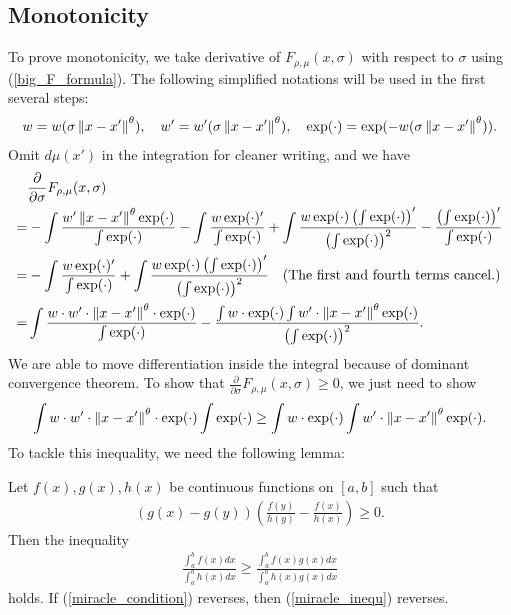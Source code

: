 \documentclass[10pt]{article}
\begin{document}
\subsection*{Monotonicity}
To prove monotonicity, we take derivative of $F_{\rho,\mu}(x,\sigma)$ with
respect to $\sigma$ using (\ref{big_F_formula}). The following simplified
notations will be used in the first several steps:
\begin{align}
    w = w(\sigma\left\lVert x-x'\right\rVert^{\theta}), \quad w'=w'(\sigma\left\lVert x-x'\right\rVert^{\theta}), \quad \exp(\cdot) = \exp(-w(\sigma\left\lVert x-x'\right\rVert^{\theta})).
\end{align}
Omit $d\mu(x')$ in the integration for cleaner writing, and we have
\begin{align}
      & \frac{\partial}{\partial \sigma} F_{\rho,\mu}(x,\sigma) \nonumber                                                                                                                                    \\
    = & -\int \frac{w'\left\lVert x-x'\right\rVert^{\theta}\exp(\cdot)}{\int \exp(\cdot)} -\int \frac{w\exp(\cdot)'}{\int \exp(\cdot)} +
    \int \frac{w \exp(\cdot) \left(\int \exp(\cdot)\right)'}{\left(\int \exp(\cdot)\right)^2} - \frac{\left(\int \exp(\cdot)\right)'}{\int \exp(\cdot)} \nonumber                                            \\
    = & -\int \frac{w\exp(\cdot)'}{\int \exp(\cdot)} +
    \int \frac{w \exp(\cdot) \left(\int \exp(\cdot)\right)'}{\left(\int \exp(\cdot)\right)^2} \quad \text{\normalfont (The first and fourth terms cancel.)} \nonumber                                        \\
    = & \int \frac{w\cdot w' \cdot \left\lVert x-x'\right\rVert^{\theta} \cdot \exp(\cdot)}{\int \exp(\cdot)}-\frac{\int w \cdot \exp(\cdot) \int w'\cdot \left\lVert x-x'\right\rVert^{\theta} \exp(\cdot)}{\left(\int \exp(\cdot)\right)^2}.
\end{align}
We are able to move differentiation inside the integral because of dominant convergence theorem. To show that $\frac{\partial}{\partial \sigma} F_{\rho,\mu}(x,\sigma) \geq 0$, we just need to show
\begin{align} \label{monotone_inequ}
    \int w\cdot w' \cdot \left\lVert x-x'\right\rVert^{\theta} \cdot \exp(\cdot) \int \exp(\cdot) \geq \int w \cdot \exp(\cdot) \int w'\cdot \left\lVert x-x'\right\rVert^{\theta} \exp(\cdot).
\end{align}
To tackle this inequality, we need the following lemma:
\begin{lemma}
    Let $f(x),g(x),h(x)$ be continuous functions on $[a,b]$ such that
    \begin{align} \label{miracle_condition}
        \left(g(x)-g(y)\right)\left(\frac{f(y)}{h(y)}-\frac{f(x)}{h(x)}\right) \geq 0.
    \end{align}
    Then the inequality
    \begin{align} \label{miracle_inequ}
        \frac{\int_a^b f(x)dx}{\int_a^b h(x)dx} \geq \frac{\int_a^b f(x)g(x)dx}{\int_a^b h(x)g(x)dx}
    \end{align}
    holds. If (\ref{miracle_condition}) reverses, then (\ref{miracle_inequ}) reverses.
\end{lemma}
\end{document}
